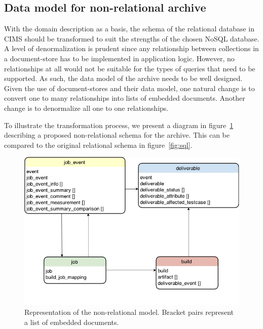 \subsection{Data model for non-relational archive} \label{nosqlmodel}
With the domain description as a basis, the schema of the relational database in CIMS should be transformed to suit the strengths of the chosen NoSQL database. A level of denormalization is prudent since any relationship between collections in a document-store has to be implemented in application logic. However, no relationships at all would not be suitable for the types of queries that need to be supported. As such, the data model of the archive needs to be well designed. Given the use of document-stores and their data model, one natural change is to convert one to many relationships into lists of embedded documents. Another change is to denormalize all one to one relationships.

To illustrate the transformation process, we present a diagram in figure~\ref{fig:nosql} describing a proposed non-relational schema for the archive. This can be compared to the original relational schema in figure~\ref{fig:sql}.

\begin{figure}[h!]
\centering
\includegraphics[scale=0.5]{figure/nosql.png}
\caption{Representation of the non-relational model. Bracket pairs represent a list of embedded documents.}
\label{fig:nosql}
\end{figure}

